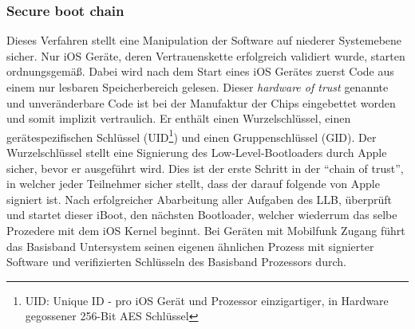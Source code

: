 	\subsubsection{Secure boot chain}\label{sec:secure-boot-chain}
		Dieses Verfahren stellt eine Manipulation der Software auf niederer
		Systemebene sicher.
		Nur iOS Geräte, deren Vertrauenskette erfolgreich validiert wurde, starten
		ordnungsgemäß. Dabei wird nach dem Start eines iOS Gerätes zuerst Code aus
		einem nur lesbaren Speicherbereich gelesen. Dieser \textit{hardware of
		trust} genannte und unveränderbare Code ist bei der
		Manufaktur der Chips eingebettet worden und somit implizit vertraulich.
		Er enthält einen Wurzelschlüssel, einen gerätespezifischen Schlüssel 
		(UID\footnote{UID: Unique ID - pro iOS Gerät und Prozessor einzigartiger,
		in Hardware gegossener 256-Bit AES Schlüssel}) und einen Gruppenschlüssel
		(GID). Der Wurzelschlüssel stellt eine Signierung des Low-Level-Bootloaders
		durch Apple sicher, bevor er ausgeführt wird.
		Dies ist der erste Schritt in der "`chain of trust"', in welcher jeder
		Teilnehmer sicher stellt, dass der darauf folgende von Apple signiert ist. 		
		Nach erfolgreicher Abarbeitung aller Aufgaben des LLB, überprüft und startet
		dieser iBoot, den nächsten Bootloader, welcher wiederrum das selbe Prozedere
		mit dem iOS Kernel beginnt. Bei Geräten mit Mobilfunk Zugang führt das
		Basisband Untersystem seinen eigenen ähnlichen Prozess mit signierter 
		Software und verifizierten Schlüsseln des Basisband Prozessors durch.
		
